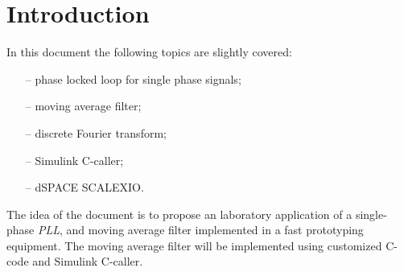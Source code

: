 \documentclass[11pt,a4paper,oneside]{book}
\title{\textbf{ 
	\begin{LARGE}
		Phase Lock Loop for Single-Phase Signals
	\end{LARGE} \\[12pt]
	\begin{LARGE}
		and
	\end{LARGE}\\[12pt]
	\begin{LARGE}
	Moving Average Filter Design
	\end{LARGE}\\[24pt]
	\begin{Large}
	An Application with dSPACE-SCALEXIO
	\end{Large}}
}
\author{\textbf{davide bagnara}}
\numberwithin{equation}{section}
\theoremstyle{it}
\theoremstyle{definition}
\begin{document}
	\thispagestyle{firstpage}
	\begin{mybox}
		\maketitle
		\vspace{100mm}
	\end{mybox}
	\newpage
	\tableofcontents
	\listoffigures	
	\listoftables
	\newpage
	
\chapter{Introduction}
In this document the following topics are slightly covered: 
\begin{itemize}
	\item[--] phase locked loop for single phase signals;
	\item[--] moving average filter;
	\item[--] discrete Fourier transform;
	\item[--] Simulink C-caller;
	\item[--] dSPACE SCALEXIO.	
\end{itemize} 
The idea of the document is to propose an laboratory application of a single-phase \textit{PLL}, and moving average filter implemented in a fast prototyping equipment. The moving average filter will be implemented using customized C-code and Simulink C-caller.
\end{document}
